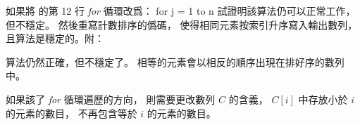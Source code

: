 \startEXERCISE
如果將  的第 12 行 \emph{for} 循環改爲：
\startCLRSCODE[start=12]
for j = 1 to n
\stopCLRSCODE
試證明該算法仍可以正常工作，但不穩定。
然後重寫計數排序的僞碼，
使得相同元素按索引升序寫入輸出數列，
且算法是穩定的。附：

\stopEXERCISE

\startANSWER
算法仍然正確，但不穩定了。
相等的元素會以相反的順序出現在排好序的數列中。

如果該了 \emph{for} 循環遍歷的方向，
則需要更改數列 $C$ 的含義，
 $C[i]$ 中存放小於 $i$ 的元素的數目，
 不再包含等於 $i$ 的元素的數目。

\stopANSWER
